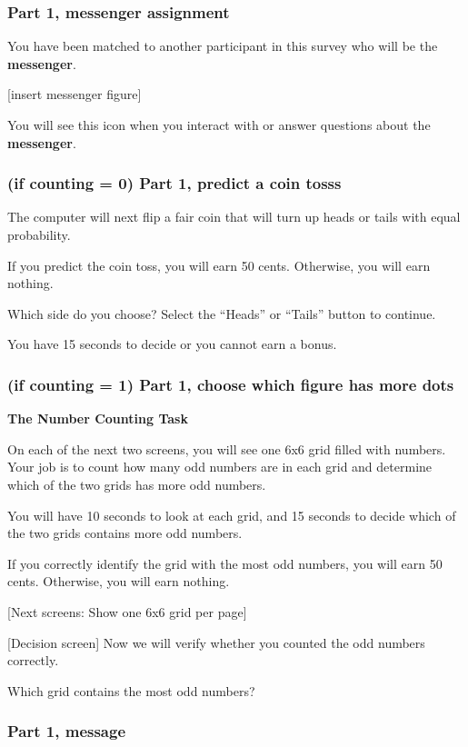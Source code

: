 \subsubsection*{Part 1, messenger assignment}

You have been matched to another participant in this survey who will be the
\textbf{messenger}. 

[insert messenger figure]

You will see this icon when you interact with or answer questions about the
\textbf{messenger}.

\subsubsection*{(if counting = 0) Part 1, predict a coin tosss}
The computer will next flip a fair coin that will turn up heads or tails with
equal probability. 

If you predict the coin toss, you will earn 50 cents.
Otherwise, you will earn nothing. 

Which side do you choose? Select the ``Heads''
or ``Tails'' button to continue. 

You have 15 seconds to decide or you cannot
earn a bonus.

\subsubsection*{(if counting = 1) Part 1, choose which figure has more dots}

\textbf{The Number Counting Task} 

On each of the next two screens, you will see one 6x6
grid filled with numbers. Your job is to count how many odd numbers are in each
grid and determine which of the two grids has more odd numbers. 

You will have 10
seconds to look at each grid, and 15 seconds to decide which of the two grids
contains more odd numbers. 

If you correctly identify the grid with the most odd
numbers, you will earn 50 cents. Otherwise, you will earn nothing. 

[Next screens:
Show one 6x6 grid per page] 

[Decision screen] Now we will verify whether you
counted the odd numbers correctly. 

Which grid contains the most odd numbers?

\subsubsection*{Part 1, message}


